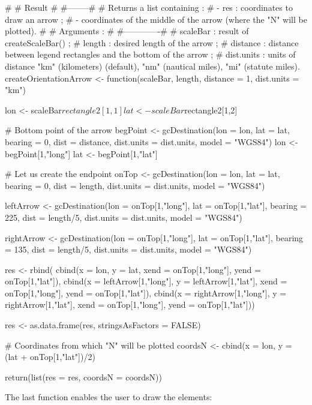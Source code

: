 #
# Result #
#--------#
# Returns a list containing :
#   - res : coordinates to draw an arrow ;
#   - coordinates of the middle of the arrow (where the "N" will be plotted).
#
# Arguments : #
#-------------#
# scaleBar : result of createScaleBar() ;
# length : desired length of the arrow ;
# distance : distance between legend rectangles and the bottom of the arrow ;
# dist.units : units of distance "km" (kilometers) (default), "nm" (nautical miles), "mi" (statute miles).
createOrientationArrow <- function(scaleBar, length, distance = 1, dist.units = "km"){
    lon <- scaleBar$rectangle2[1,1]
    lat <- scaleBar$rectangle2[1,2]
     
    # Bottom point of the arrow
    begPoint <- gcDestination(lon = lon, lat = lat, bearing = 0, dist = distance, dist.units = dist.units, model = "WGS84")
    lon <- begPoint[1,"long"]
    lat <- begPoint[1,"lat"]
     
    # Let us create the endpoint
    onTop <- gcDestination(lon = lon, lat = lat, bearing = 0, dist = length, dist.units = dist.units, model = "WGS84")
     
    leftArrow <- gcDestination(lon = onTop[1,"long"], lat = onTop[1,"lat"], bearing = 225, dist = length/5, dist.units = dist.units, model = "WGS84")
     
    rightArrow <- gcDestination(lon = onTop[1,"long"], lat = onTop[1,"lat"], bearing = 135, dist = length/5, dist.units = dist.units, model = "WGS84")
     
    res <- rbind(
            cbind(x = lon, y = lat, xend = onTop[1,"long"], yend = onTop[1,"lat"]),
            cbind(x = leftArrow[1,"long"], y = leftArrow[1,"lat"], xend = onTop[1,"long"], yend = onTop[1,"lat"]),
            cbind(x = rightArrow[1,"long"], y = rightArrow[1,"lat"], xend = onTop[1,"long"], yend = onTop[1,"lat"]))
     
    res <- as.data.frame(res, stringsAsFactors = FALSE)
     
    # Coordinates from which "N" will be plotted
    coordsN <- cbind(x = lon, y = (lat + onTop[1,"lat"])/2)
     
    return(list(res = res, coordsN = coordsN))
}
The last function enables the user to draw the elements:


